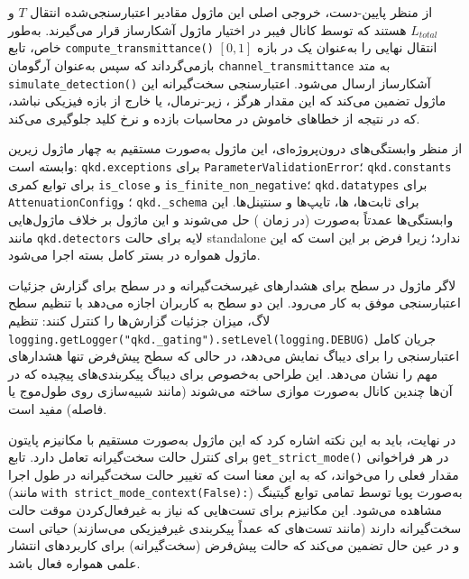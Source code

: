 از منظر پایین-دست، خروجی اصلی این ماژول مقادیر اعتبارسنجی‌شده انتقال $T$ و $L_{total}$ هستند که توسط کانال فیبر در اختیار ماژول آشکارساز  قرار می‌گیرند. به‌طور خاص، تابع \texttt{compute\_transmittance()} انتقال نهایی را به‌عنوان یک  در بازه $[0, 1]$ بازمی‌گرداند که سپس به‌عنوان آرگومان \texttt{channel\_transmittance} به متد \texttt{simulate\_detection()} آشکارساز ارسال می‌شود. اعتبارسنجی سخت‌گیرانه این ماژول تضمین می‌کند که این مقدار هرگز ، زیر-نرمال، یا خارج از بازه فیزیکی نباشد، که در نتیجه از خطاهای خاموش در محاسبات بازده  و نرخ کلید جلوگیری می‌کند.

از منظر وابستگی‌های درون‌پروژه‌ای، این ماژول به‌صورت مستقیم به چهار ماژول زیرین وابسته است: \texttt{qkd.exceptions} برای \texttt{ParameterValidationError}؛ \texttt{qkd.constants} برای توابع کمری \texttt{is\_close} و \texttt{is\_finite\_non\_negative}؛ \texttt{qkd.datatypes} برای \texttt{AttenuationConfig}؛ و \texttt{qkd.\_schema} برای ثابت‌ها، ها، تایپ‌ها و سنتینل‌ها. این وابستگی‌ها عمدتاً به‌صورت  (در زمان ) حل می‌شوند و این ماژول بر خلاف ماژول‌هایی مانند \texttt{qkd.detectors} لایه  برای حالت standalone ندارد؛ زیرا فرض بر این است که این ماژول همواره در بستر کامل بسته  اجرا می‌شود.

لاگر ماژول در سطح  برای هشدارهای غیرسخت‌گیرانه و در سطح  برای گزارش جزئیات اعتبارسنجی موفق به کار می‌رود. این دو سطح به کاربران اجازه می‌دهد با تنظیم سطح لاگ، میزان جزئیات گزارش‌ها را کنترل کنند: تنظیم \texttt{logging.getLogger("qkd.\_gating").setLevel(logging.DEBUG)} جریان کامل اعتبارسنجی را برای دیباگ نمایش می‌دهد، در حالی که سطح پیش‌فرض  تنها هشدارهای مهم را نشان می‌دهد. این طراحی به‌خصوص برای دیباگ پیکربندی‌های پیچیده که در آن‌ها چندین کانال به‌صورت موازی ساخته می‌شوند (مانند شبیه‌سازی  روی طول‌موج یا فاصله) مفید است.

در نهایت، باید به این نکته اشاره کرد که این ماژول به‌صورت مستقیم با مکانیزم  پایتون برای کنترل حالت سخت‌گیرانه تعامل دارد. تابع \texttt{get\_strict\_mode()} در هر فراخوانی مقدار فعلی  را می‌خواند، که به این معنا است که تغییر حالت سخت‌گیرانه در طول اجرا (مانند \texttt{with strict\_mode\_context(False):}) به‌صورت پویا توسط تمامی توابع گیتینگ مشاهده می‌شود. این مکانیزم برای تست‌هایی که نیاز به غیرفعال‌کردن موقت حالت سخت‌گیرانه دارند (مانند تست‌های  که عمداً پیکربندی غیرفیزیکی می‌سازند) حیاتی است و در عین حال تضمین می‌کند که حالت پیش‌فرض (سخت‌گیرانه) برای کاربردهای انتشار علمی همواره فعال باشد.
